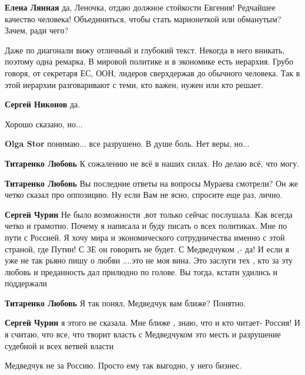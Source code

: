 \begin{itemize}
\begin{itemize}
\textbf{Елена Лянная} да, Леночка, отдаю должное стойкости Евгения! Редчайшее качество человека!
Объединиться, чтобы стать марионеткой или обманутым? Зачем, ради чего?

\end{itemize} %


Даже по диагонали вижу отличный и глубокий текст. Некогда в него вникать,
поэтому одна ремарка. В мировой политике и в экономике есть иерархия. Грубо
говоря, от секретаря ЕС, ООН, лидеров сверхдержав до обычного человека. Так в
этой иерархии разговаривают с теми, кто важен, нужен или кто решает.

\begin{itemize} %
\textbf{Сергей Никонов} да.
\end{itemize} %

Хорошо сказано, но...

\begin{itemize} %
\textbf{Olga Stor} понимаю... все разрушено.
В душе боль. Нет веры, но...

\textbf{Титаренко Любовь} К сожалению не всё в наших силах. Но делаю всё, что могу.

\textbf{Титаренко Любовь} Вы последние ответы на вопросы Мураева смотрели? Он же четко сказал про оппозицию. Ну если Вам не ясно, спросите еще раз, лично.

\textbf{Сергей Чурин} Не было возможности ,вот только сейчас послушала. Как всегда четко и грамотно.
Почему я написала и буду писать о всех политиках. Мне по пути с Россией. Я хочу мира и экономического сотрудничества именно с этой страной, где Путин!
С ЗЕ он говорить не будет.
С Медведчуком ,- да!
И если я уже не так рьяно пишу о любви ....это не моя вина. Это заслуги тех , кто за эту любовь и преданность дал прилюдно по голове. Вы тогда, кстати удились и поддержали

\textbf{Титаренко Любовь} Я так понял, Медведчук вам ближе? Понятно.

\textbf{Сергей Чурин} я этого не сказала. Мне ближе , знаю, что и кто читает- Россия!
И я считаю, что все, что творит власть с Медведчуком это месть и разрушение судебной и всех ветвей власти

Медведчук не за Россию. Просто ему так выгодно, у него бизнес.
\end{itemize} %


\end{itemize}
